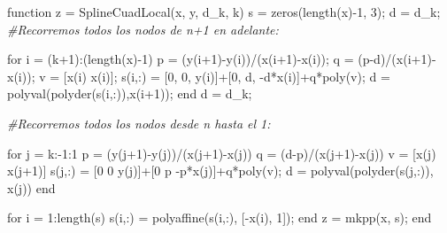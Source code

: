 \documentclass[11pt,spanish,]{article}
\newenvironment{Shaded}{}{}
\newcommand{\BaseNTok}[1]{\textcolor[rgb]{0.25,0.63,0.44}{{#1}}}
\newcommand{\FloatTok}[1]{\textcolor[rgb]{0.25,0.63,0.44}{{#1}}}
\newcommand{\CommentTok}[1]{\textcolor[rgb]{0.38,0.63,0.69}{\textit{{#1}}}}
\newcommand{\FunctionTok}[1]{\textcolor[rgb]{0.02,0.16,0.49}{{#1}}}
\newcommand{\NormalTok}[1]{{#1}}
\theoremstyle{definition} \newtheorem*{definicion}{Definición}
\begin{document}
\begin{Shaded}
\begin{Highlighting}[]
\NormalTok{function z = SplineCuadLocal(x, y, d_k, k)}
    \NormalTok{s = }\FunctionTok{zeros}\NormalTok{(}\FunctionTok{length}\NormalTok{(x)-}\FloatTok{1}\NormalTok{, }\FloatTok{3}\NormalTok{);}
  \NormalTok{d = d_k;}
  \CommentTok{#Recorremos todos los nodos de n+1 en adelante:}

  \NormalTok{for }\BaseNTok{i} \NormalTok{= (k+}\FloatTok{1}\NormalTok{):(}\FunctionTok{length}\NormalTok{(x)-}\FloatTok{1}\NormalTok{)}
        \NormalTok{p = (y(}\BaseNTok{i}\NormalTok{+}\FloatTok{1}\NormalTok{)-y(}\BaseNTok{i}\NormalTok{))/(x(}\BaseNTok{i}\NormalTok{+}\FloatTok{1}\NormalTok{)-x(}\BaseNTok{i}\NormalTok{));}
        \NormalTok{q = (p-d)/(x(}\BaseNTok{i}\NormalTok{+}\FloatTok{1}\NormalTok{)-x(}\BaseNTok{i}\NormalTok{));}
        \NormalTok{v = [x(}\BaseNTok{i}\NormalTok{) x(}\BaseNTok{i}\NormalTok{)];}
        \NormalTok{s(}\BaseNTok{i}\NormalTok{,:) = [}\FloatTok{0}\NormalTok{, }\FloatTok{0}\NormalTok{, y(}\BaseNTok{i}\NormalTok{)]+[}\FloatTok{0}\NormalTok{, d, -d*x(}\BaseNTok{i}\NormalTok{)]+q*}\FunctionTok{poly}\NormalTok{(v);}
        \NormalTok{d = }\FunctionTok{polyval}\NormalTok{(}\FunctionTok{polyder}\NormalTok{(s(}\BaseNTok{i}\NormalTok{,:)),x(}\BaseNTok{i}\NormalTok{+}\FloatTok{1}\NormalTok{));}
    \NormalTok{end}
    \NormalTok{d = d_k;}

  \CommentTok{#Recorremos todos los nodos desde n hasta el 1:}

  \NormalTok{for }\BaseNTok{j} \NormalTok{= k:-}\FloatTok{1}\NormalTok{:}\FloatTok{1}
        \NormalTok{p = (y(}\BaseNTok{j}\NormalTok{+}\FloatTok{1}\NormalTok{)-y(}\BaseNTok{j}\NormalTok{))/(x(}\BaseNTok{j}\NormalTok{+}\FloatTok{1}\NormalTok{)-x(}\BaseNTok{j}\NormalTok{))}
        \NormalTok{q = (d-p)/(x(}\BaseNTok{j}\NormalTok{+}\FloatTok{1}\NormalTok{)-x(}\BaseNTok{j}\NormalTok{))}
        \NormalTok{v = [x(}\BaseNTok{j}\NormalTok{) x(}\BaseNTok{j}\NormalTok{+}\FloatTok{1}\NormalTok{)]}
        \NormalTok{s(}\BaseNTok{j}\NormalTok{,:) = [}\FloatTok{0} \FloatTok{0} \NormalTok{y(}\BaseNTok{j}\NormalTok{)]+[}\FloatTok{0} \NormalTok{p -p*x(}\BaseNTok{j}\NormalTok{)]+q*}\FunctionTok{poly}\NormalTok{(v);}
        \NormalTok{d = }\FunctionTok{polyval}\NormalTok{(}\FunctionTok{polyder}\NormalTok{(s(}\BaseNTok{j}\NormalTok{,:)), x(}\BaseNTok{j}\NormalTok{))}
  \NormalTok{end}

  \NormalTok{for }\BaseNTok{i} \NormalTok{= }\FloatTok{1}\NormalTok{:}\FunctionTok{length}\NormalTok{(s)}
    \NormalTok{s(}\BaseNTok{i}\NormalTok{,:) = polyaffine(s(}\BaseNTok{i}\NormalTok{,:), [-x(}\BaseNTok{i}\NormalTok{), }\FloatTok{1}\NormalTok{]);}
  \NormalTok{end}
    \NormalTok{z = }\FunctionTok{mkpp}\NormalTok{(x, s);}
\NormalTok{end}
\end{Highlighting}
\end{Shaded}
\end{document}

